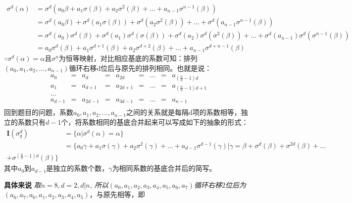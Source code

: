 \begin{enumerate}
\begin{solution}
\begin{equation*}
\begin{aligned}
                \sigma^d(\alpha)&=\sigma^d(a_0\beta+a_1\sigma(\beta)+a_2\sigma^2(\beta)+\dots+a_{n-1}\sigma^{n-1}(\beta))\\
                &=\sigma^d(a_0\beta)+\sigma^d(a_1\sigma(\beta))+\sigma^d(a_2\sigma^2(\beta))+\dots+\sigma^d(a_{n-1}\sigma^{n-1}(\beta))\\
                &=\sigma^d(a_0)\sigma^d(\beta)+\sigma^d(a_1)\sigma^d(\sigma(\beta))+\sigma^d(a_2)\sigma^d(\sigma^2(\beta))+\dots+\sigma^d(a_{n-1})\sigma^d(\sigma^{n-1}(\beta))\\
                &=a_0\sigma^d(\beta)+a_1\sigma^{d+1}(\beta)+a_2\sigma^{d+2}(\beta)+\dots+a_{n-1}\sigma^{d+n-1}(\beta)
            \end{aligned}
        \end{equation*}
        $\because\sigma^d(\alpha)=\alpha$且$\sigma^n$为恒等映射，对比相应基底的系数可知：排列$(a_0,a_1,a_2,\dots,a_{n-1})$循环右移d位后与原先的排列相同。也就是说：
        \begin{equation*}
            \begin{aligned}
                a_0&=&a_d&=&a_{2d}&=&\dots&=&a_{(\frac{n}{d}-1)d}\\
                a_1&=&a_{d+1}&=&a_{2d+1}&=&\dots&=&a_{(\frac{n}{d}-1)d+1}\\
                \ldots\\
                a_{d-1}&=&a_{2d-1}&=&a_{3d-1}&=&\dots&=&a_{n-1}\\
            \end{aligned}
        \end{equation*}
        回到题目的问题，系数$a_0,a_1,a_2,\dots,a_{n-1}$之间的关系就是每隔d项的系数相等，独立的系数只有$d-1$个，将系数相同的基底合并起来可以写成如下的抽象的形式：
        \begin{equation*}
            \begin{aligned}
                \textbf{I}(\sigma_q^d)&=\{\alpha|\sigma^d(\alpha)=\alpha\}\\
                &=\{a_0\gamma+a_1\sigma(\gamma)+a_2\sigma^2(\gamma)+\dots+a_{d-1}\sigma^{d-1}(\gamma)|\gamma=\beta+\sigma^d(\beta)+\sigma^{2d}(\beta)+\dots\\+\sigma^{(\frac{n}{d}-1)d}(\beta)\}
            \end{aligned}
        \end{equation*}
        其中$a_0$到$a_{d-1}$是独立的系数个数，$\gamma$为相同系数的基底合并后的简写。
        \begin{tcolorbox}
            \textbf{具体来说} 
            \textit{取$n=8, d=2, d|n$, 所以$(a_0,a_1,a_2,a_3,a_4,a_5,a_6,a_7)$循环右移$2$位后为}$(a_6,a_7,a_0,a_1,a_2,a_3,a_4,a_5)$，与原先相等，即

\end{tcolorbox}
\end{solution}
\end{enumerate}
